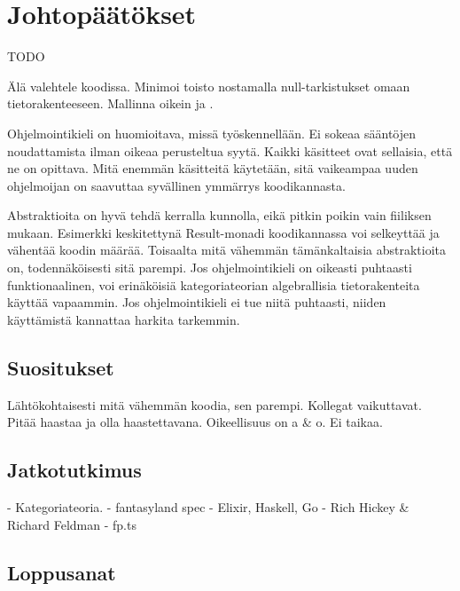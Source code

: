 \vspace{21.5pt}
\chapter{Johtopäätökset}
TODO

Älä valehtele koodissa. Minimoi toisto nostamalla null-tarkistukset omaan tietorakenteeseen.
Mallinna oikein ja .

Ohjelmointikieli on huomioitava, missä työskennellään. Ei sokeaa sääntöjen noudattamista ilman oikeaa perusteltua syytä. Kaikki käsitteet ovat sellaisia, että ne on opittava. Mitä enemmän käsitteitä käytetään, sitä vaikeampaa uuden ohjelmoijan on saavuttaa syvällinen ymmärrys koodikannasta.

Abstraktioita on hyvä tehdä kerralla kunnolla, eikä pitkin poikin vain fiiliksen mukaan. Esimerkki keskitettynä Result-monadi koodikannassa voi selkeyttää ja vähentää koodin määrää. Toisaalta mitä vähemmän tämänkaltaisia abstraktioita on, todennäköisesti sitä parempi. Jos ohjelmointikieli on oikeasti puhtaasti funktionaalinen, voi erinäköisiä kategoriateorian algebrallisia tietorakenteita käyttää vapaammin. Jos ohjelmointikieli ei tue niitä puhtaasti, niiden käyttämistä kannattaa harkita tarkemmin.

\section{Suositukset}

Lähtökohtaisesti mitä vähemmän koodia, sen parempi. Kollegat vaikuttavat. Pitää haastaa ja olla haastettavana. Oikeellisuus on a \& o. Ei taikaa.


\section{Jatkotutkimus}

- Kategoriateoria.
- fantasyland spec
- Elixir, Haskell, Go
- Rich Hickey \& Richard Feldman
- fp.ts

\section{Loppusanat}


